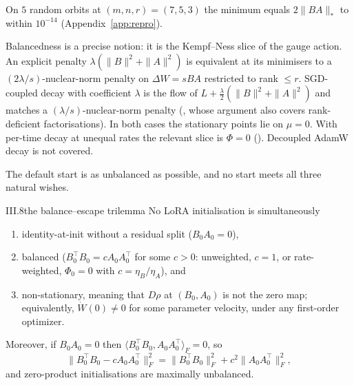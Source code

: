 \noindent{}\enspace On $5$ random orbits at $(m,n,r)=(7,5,3)$ the minimum equals $2\|BA\|_*$ to within $10^{-14}$ (Appendix~\ref{app:repro}).

\begin{explains}
Balancedness is a precise notion: it is the Kempf--Ness slice of the gauge action. An explicit penalty $\lambda(\|B\|^2+\|A\|^2)$ is equivalent at its minimisers to a $(2\lambda/s)$-nuclear-norm penalty on $\Delta W=sBA$ restricted to rank $\le r$. SGD-coupled decay with coefficient $\lambda$ is the flow of $L+\tfrac\lambda2(\|B\|^2+\|A\|^2)$ and matches a $(\lambda/s)$-nuclear-norm penalty (\citealp{xsrebro2004maximum}, whose argument also covers rank-deficient factorisations). In both cases the stationary points lie on $\mu=0$. With per-time decay at unequal rates the relevant slice is $\Phi=0$ (). Decoupled AdamW decay is not covered.
\end{explains}

The default start is as unbalanced as possible, and no start meets all three natural wishes.

\begin{proposition}{III.8}{the balance--escape trilemma}
No LoRA initialisation is simultaneously
\begin{enumerate}[label=(\alph*)]
\item identity-at-init without a residual split ($B_0A_0=0$),
\item balanced ($B_0^\top B_0=cA_0A_0^\top$ for some $c>0$: unweighted, $c=1$, or rate-weighted, $\Phi_0=0$ with $c=\eta_B/\eta_A$), and
\item non-stationary, meaning that $D\rho$ at $(B_0,A_0)$ is not the zero map; equivalently, $\dot W(0)\ne0$ for some parameter velocity, under any first-order optimizer.
\end{enumerate}
Moreover, if $B_0A_0=0$ then $\langle B_0^\top B_0,A_0A_0^\top\rangle_F=0$, so
\[\|B_0^\top B_0-cA_0A_0^\top\|_F^2=\|B_0^\top B_0\|_F^2+c^2\|A_0A_0^\top\|_F^2,\]
and zero-product initialisations are maximally unbalanced.
\end{proposition}

